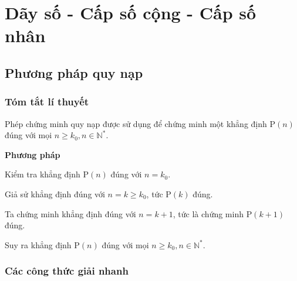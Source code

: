 \chapter{Dãy số - Cấp số cộng - Cấp  số nhân}
\section{Phương pháp quy nạp}
\subsection{Tóm tắt lí thuyết}
Phép chứng minh quy nạp được sử dụng để chứng minh một khẳng định $\mathrm{P}(n)$ đúng với mọi $n\ge k_0,n\in \mathbb{N}^{*}$.\medskip

\textbf{Phương pháp}

\begin{list}{+}{}
	\item Kiểm tra khẳng định $\mathrm{P}(n)$ đúng với $n=k_0.$
	\item Giả sử khẳng định đúng với $n=k\ge k_0$, tức $\mathrm{P}(k)$ đúng.
	\item Ta chứng minh khẳng định đúng với $n=k+1$, tức là chứng minh $\mathrm{P}(k+1)$ đúng.
\end{list}
Suy ra khẳng định $\mathrm{P}(n)$ đúng với mọi $n\ge k_0,n\in \mathbb{N}^{*}$.
\subsection{Các công thức giải nhanh}

